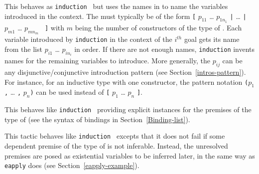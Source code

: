 \begin{Variants}
\item{}

  This behaves as {\tt induction {\term}} but uses the names in
  {\disjconjintropattern} to name the variables introduced in the context.
  The {\disjconjintropattern} must typically be of the form
  {\tt [} $p_{11}$ {\ldots}
  $p_{1n_1}$ {\tt |} {\ldots} {\tt |} $p_{m1}$ {\ldots} $p_{mn_m}$ {\tt
    ]} with $m$ being the number of constructors of the type of
  {\term}. Each variable introduced by {\tt induction} in the context
  of the $i^{th}$ goal gets its name from the list $p_{i1}$ {\ldots}
  $p_{in_i}$ in order. If there are not enough names, {\tt induction}
  invents names for the remaining variables to introduce. More
  generally, the $p_{ij}$ can be any disjunctive/conjunctive
  introduction pattern (see Section~\ref{intros-pattern}). For instance,
  for an inductive type with one constructor, the pattern notation
  {\tt (}$p_{1}$ {\tt ,} {\ldots} {\tt ,} $p_{n}${\tt )} can be used instead of
  {\tt [} $p_{1}$ {\ldots} $p_{n}$ {\tt ]}.





\item{}

  This behaves like \texttt{induction {\term}} providing explicit
  instances for the premises of the type of {\term} (see the syntax of
  bindings in Section~\ref{Binding-list}).

\item{}

  This tactic behaves like \texttt{induction {\term}} excepts that it
  does not fail if some dependent premise of the type of {\term} is
  not inferable. Instead, the unresolved premises are posed as
  existential variables to be inferred later, in the same way as {\tt
  eapply} does (see Section~\ref{eapply-example}).


\end{Variants}
